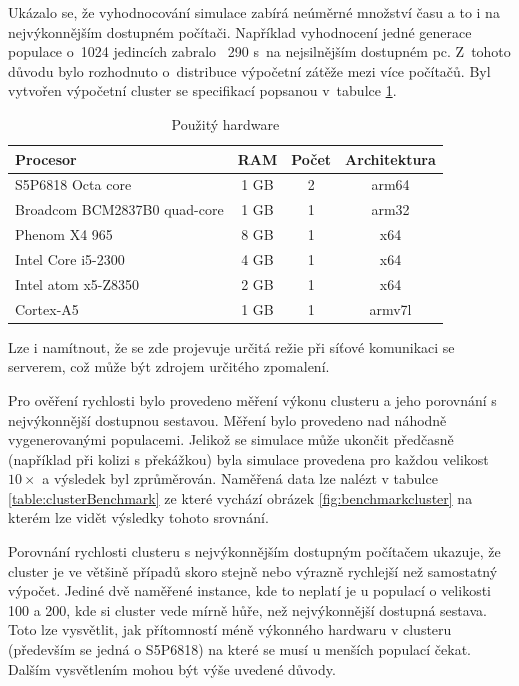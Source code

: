 \label{sec:cluster}
Ukázalo se, že vyhodnocování simulace zabírá neúměrné množství času a to i na nejvýkonnějším dostupném počítači. 
Například vyhodnocení jedné generace populace o~1024 jedincích zabralo ~290 s~na nejsilnějším dostupném pc. Z~tohoto důvodu bylo rozhodnuto o~distribuce výpočetní zátěže mezi více počítačů. Byl vytvořen výpočetní cluster se specifikací popsanou v~tabulce \ref{table:hw_table}.
\begin{table}[h!]
	\centering
	\begin{tabular}{|l|c|c|c|}
		\hline 
		Procesor & RAM & Počet & Architektura\\ 
		\hline 
		S5P6818 Octa core & 1 GB & 2 & arm64 \\ 
		\hline 
		Broadcom BCM2837B0 quad-core & 1 GB & 1 & arm32 \\ 
		\hline 
		Phenom X4 965 & 8 GB & 1 & x64 \\ 
		\hline
		Intel Core i5-2300 & 4 GB & 1 & x64 \\ 
		\hline 
		Intel atom x5-Z8350 & 2 GB & 1 & x64 \\ 
		\hline
		Cortex-A5 & 1 GB & 1 & armv7l \\
		\hline
	\end{tabular} 
	\caption{Použitý hardware}
	\label{table:hw_table}
	
\end{table}
Lze i namítnout, že se zde projevuje určitá režie při síťové komunikaci se serverem, což může být zdrojem určitého zpomalení.

Pro ověření rychlosti bylo provedeno měření výkonu clusteru a jeho porovnání s nejvýkonnější dostupnou sestavou. Měření bylo provedeno nad náhodně vygenerovanými populacemi. Jelikož se simulace může ukončit předčasně (například při kolizi s překážkou) byla simulace provedena pro každou velikost $10\times$ a výsledek byl zprůměrován. Naměřená data lze nalézt v tabulce \ref{table:clusterBenchmark} ze které vychází obrázek \ref{fig:benchmarkcluster} na kterém lze vidět výsledky tohoto srovnání. 

Porovnání rychlosti clusteru s nejvýkonnějším dostupným počítačem ukazuje, že cluster je ve většině případů skoro stejně nebo  výrazně rychlejší než samostatný výpočet. Jediné dvě naměřené instance, kde to neplatí je u populací o velikosti 100 a 200, kde si cluster vede mírně hůře, než nejvýkonnější dostupná sestava. Toto lze vysvětlit, jak přítomností méně výkonného hardwaru v clusteru (především se jedná o S5P6818) na které se musí u menších populací čekat. Dalším vysvětlením mohou být výše uvedené důvody.

